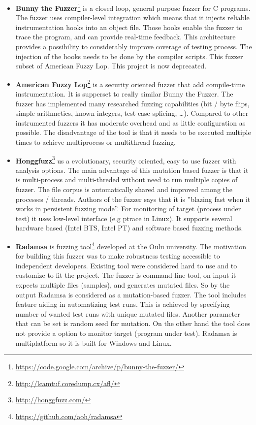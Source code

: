 \begin{itemize}

	\item \textbf{Bunny the Fuzzer}\footnote{\url{https://code.google.com/archive/p/bunny-the-fuzzer/}} is a closed loop, general purpose fuzzer for C programs.
	The fuzzer uses compiler-level integration which means that it injects reliable instrumentation hooks into an object file.
	Those hooks enable the fuzzer to trace the program, and can provide real-time feedback. This architecture provides a possibility
	to considerably improve coverage of testing process. The injection of the hooks
	needs to be done by the compiler scripts.
	This fuzzer  subset of American Fuzzy Lop. This project is now deprecated.

	\item \textbf{American Fuzzy Lop}\footnote{\url{http://lcamtuf.coredump.cx/afl/}}
	is a security oriented fuzzer that add compile-time instrumentation.
	It is supperset to really similar Bunny the Fuzzer.
	The fuzzer has implemented many researched fuzzing capabilities (bit / byte flips,  simple arithmetics, known integers, test case splicing, \ldots).
	Compared to other instrumented fuzzers it has moderate overhead and as little
	configuration as possible.
	The disadvantage of the tool is that it needs to be executed
	multiple times to achieve multiprocess or multithread fuzzing.

	\item \textbf{Honggfuzz}\footnote{\url{http://honggfuzz.com/}} us a evolutionary, security oriented, easy to use fuzzer with analysis options.
	The main advantage of this mutation based fuzzer is that it is multi-process and multi-threded without need to run multiple copies of fuzzer.
	The file corpus is automatically shared and improved among the processes / threads.
	Authors of the fuzzer says that it is ''blazing fast when it works in persistent fuzzing mode''.
	For monitoring of target (process under test) it uses low-level interface (e.g ptrace in Linux).
	It supports several hardware based (Intel BTS, Intel PT) and software based fuzzing methods.

	\item \textbf{Radamsa} is fuzzing tool\footnote{\url{https://github.com/aoh/radamsa}} developed at the Oulu university.
	The motivation for building this fuzzer was to make robustness testing accessible to independent developers.
	Existing tool were considered hard to use and to customize to fit the project.
	The fuzzer is command line tool, on input it expects multiple files (samples), and generates mutated files.
	So by the output Radamsa is considered as a mutation-based fuzzer.
	The tool includes feature aiding in automatizing test runs.
	This is achieved by specifying number of wanted test runs with unique mutated files.
	Another parameter that can be set is random seed for mutation.
	On the other hand the tool does not provide a option to monitor target (program under test).
	Radamsa is multiplatform so it is built for Windows and Linux.\cite{radamsaThesis}


\end{itemize}
